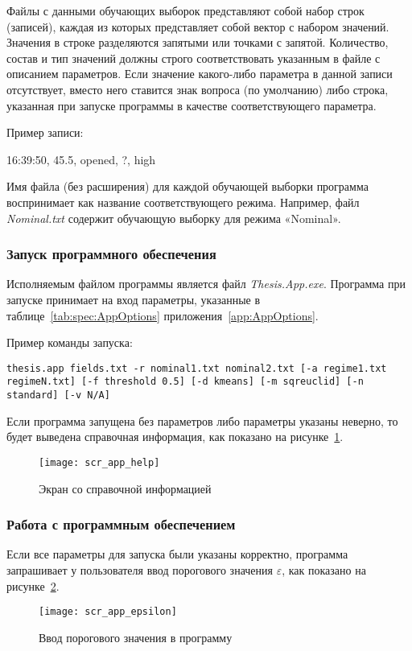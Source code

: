 Файлы с данными обучающих выборок представляют собой набор строк (записей), каждая из которых представляет собой вектор с набором значений. Значения в строке разделяются запятыми или точками с запятой. Количество, состав и тип значений должны строго соответствовать указанным в файле с описанием параметров. Если значение какого-либо параметра в данной записи отсутствует, вместо него ставится знак вопроса (по умолчанию) либо строка, указанная при запуске программы в качестве соответствующего параметра.

Пример записи:

\textsf{16:39:50, 45.5, opened, ?, high}

Имя файла (без расширения) для каждой обучающей выборки программа воспринимает как название соответствующего режима. Например, файл \textit{Nominal.txt} содержит обучающую выборку для режима «Nominal».

\subsubsection{Запуск программного обеспечения}
Исполняемым файлом программы является файл \textit{Thesis.App.exe}. Программа при запуске принимает на вход параметры, указанные в таблице~\ref{tab:spec:AppOptions} приложения~\ref{app:AppOptions}.

Пример команды запуска:

\texttt{thesis.app fields.txt -r nominal1.txt nominal2.txt [-a regime1.txt regimeN.txt] [-f threshold 0.5] [-d kmeans] [-m sqreuclid] [-n standard] [-v N/A]}

Если программа запущена без параметров либо параметры указаны неверно, то будет выведена справочная информация, как показано на рисунке~\ref{fig:spec:scr:AppHelp}.

\begin{figure}[h]
\texttt{[image: scr\_app\_help]}
\caption{Экран со справочной информацией}
\label{fig:spec:scr:AppHelp}
\end{figure}

\subsubsection{Работа с программным обеспечением}
Если все параметры для запуска были указаны корректно, программа запрашивает у пользователя ввод порогового значения $\varepsilon$, как показано на рисунке~\ref{fig:spec:scr:EnterEpsilon}.

\begin{figure}[h]
\texttt{[image: scr\_app\_epsilon]}
\caption{Ввод порогового значения в программу}
\label{fig:spec:scr:EnterEpsilon}
\end{figure}

